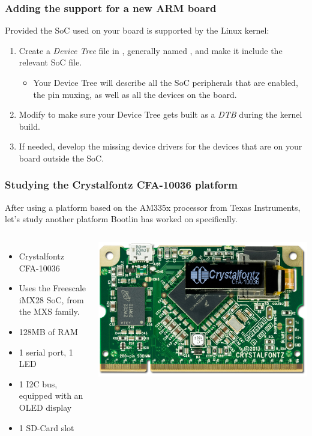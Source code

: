 \begin{frame}
  \frametitle{Adding the support for a new ARM board}
  Provided the SoC used on your board is supported by the Linux kernel:
  \begin{enumerate}
  \item Create a {\em Device Tree} file in ,
    generally named , and make it
    include the relevant SoC  file.
    \begin{itemize}
    \item Your Device Tree will describe all the SoC peripherals that
      are enabled, the pin muxing, as well as all the devices on the
      board.
    \end{itemize}
  \item Modify  to make sure your
    Device Tree gets built as a {\em DTB} during the kernel build.
  \item If needed, develop the missing device drivers for the devices
    that are on your board outside the SoC.
  \end{enumerate}
\end{frame}

\begin{frame}
  \frametitle{Studying the Crystalfontz CFA-10036 platform}
  After using a platform based on the AM335x processor from Texas
  Instruments, let's study another platform Bootlin
  has worked on specifically.
  \begin{columns}
    \begin{itemize}
    \item Crystalfontz CFA-10036
    \item Uses the Freescale iMX28 SoC, from the MXS family.
    \item 128MB of RAM
    \item 1 serial port, 1 LED
    \item 1 I2C bus, equipped with an OLED display
    \item 1 SD-Card slot
    \end{itemize}
    \includegraphics[width=\textwidth]{slides/kernel-porting-content/crystalfontz.jpg}
  \end{columns}
\end{frame}

